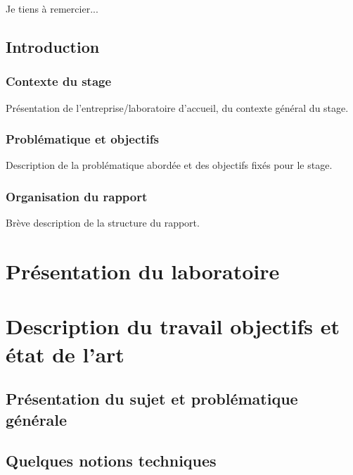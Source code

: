 \documentclass[11pt]{report}
\theoremstyle{definition}
\theoremstyle{remark}
\begin{document}
Je tiens à remercier...
\newpage

\tableofcontents

\newpage

\listoffigures
{}

\newpage

\listoftables
{}

\newpage

\section{Introduction}

\subsection{Contexte du stage}
Présentation de l'entreprise/laboratoire d'accueil, du contexte général du stage.

\subsection{Problématique et objectifs}
Description de la problématique abordée et des objectifs fixés pour le stage.

\subsection{Organisation du rapport}
Brève description de la structure du rapport.

\newpage
\chapter{Présentation du laboratoire}


\newpage
\chapter{Description du travail objectifs et état de l'art}
    
    \section{Présentation du sujet et problématique générale}
    
    \newpage
    \section{Quelques notions techniques}
    
\end{document}
